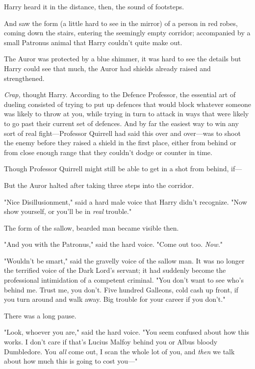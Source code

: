 Harry heard it in the distance, then, the sound of footsteps.

And saw the form (a little hard to see in the mirror) of a person in red robes,
coming down the stairs, entering the seemingly empty corridor; accompanied by a
small Patronus animal that Harry couldn't quite make out.

The Auror was protected by a blue shimmer, it was hard to see the details but
Harry could see that much, the Auror had shields already raised and
strengthened.

\emph{Crap,} thought Harry. According to the Defence Professor, the essential
art of dueling consisted of trying to put up defences that would block whatever
someone was likely to throw at you, while trying in turn to attack in ways that
were likely to go past their current set of defences. And by far the easiest
way to win any sort of real fight---Professor Quirrell had said this over and
over---was to shoot the enemy before they raised a shield in the first place,
either from behind or from close enough range that they couldn't dodge or
counter in time.

Though Professor Quirrell might still be able to get in a shot from behind,
if---

But the Auror halted after taking three steps into the corridor.

"Nice Disillusionment," said a hard male voice that Harry didn't recognize.
"Now show yourself, or you'll be in \emph{real} trouble."

The form of the sallow, bearded man became visible then.

"And you with the Patronus," said the hard voice. "Come out too. \emph{Now.}"

"Wouldn't be smart," said the gravelly voice of the sallow man. It was no
longer the terrified voice of the Dark Lord's servant; it had suddenly become
the professional intimidation of a competent criminal. "You don't want to see
who's behind me. Trust me, you don't. Five hundred Galleons, cold cash up
front, if you turn around and walk away. Big trouble for your career if you
don't."

There was a long pause.

"Look, whoever you are," said the hard voice. "You seem confused about how this
works. I don't care if that's Lucius Malfoy behind you or Albus bloody
Dumbledore. You \emph{all} come out, I scan the whole lot of you, and
\emph{then} we talk about how much this is going to cost you---"

